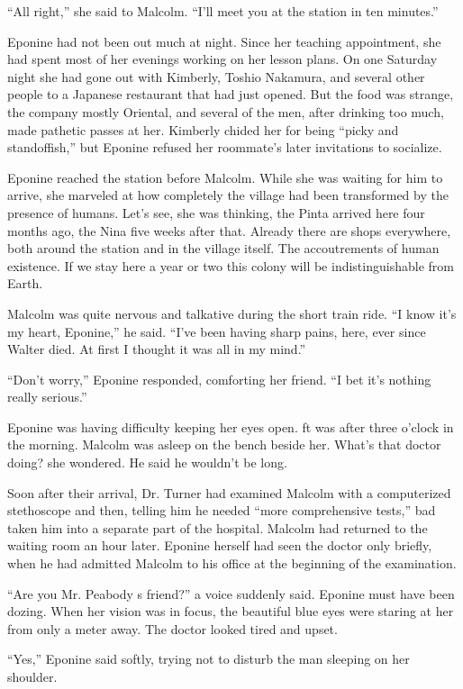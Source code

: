 \documentclass[]{article}
\begin{document}
{“All right,” she said to Malcolm.  “I’ll meet you at the station in ten minutes.”

Eponine had not been out much at night.  Since her teaching appointment, she had spent most of her evenings working on her lesson plans.  On one Saturday night she had gone out with Kimberly, Toshio Nakamura, and several other people to a Japanese restaurant that had just opened.  But the food was strange, the company mostly Oriental, and several of the men, after drinking too much, made pathetic passes at her.  Kimberly chided her for being “picky and standoffish,” but Eponine refused her roommate’s later invitations to socialize.

Eponine reached the station before Malcolm.  While she was waiting for him to arrive, she marveled at how completely the village had been transformed by the presence of humans.  Let’s see, she was thinking, the Pinta arrived here four months ago, the Nina five weeks after that.  Already there are shops everywhere, both around the station and in the village itself.  The accoutrements of human existence.  If we stay here a year or two this colony will be indistinguishable from Earth.

Malcolm was quite nervous and talkative during the short train ride.  “I know it’s my heart, Eponine,” he said.  “I’ve been having sharp pains, here, ever since Walter died.  At first I thought it was all in my mind.”

“Don’t worry,” Eponine responded, comforting her friend.  “I bet it’s nothing really serious.”

Eponine was having difficulty keeping her eyes open.  ft was after three o’clock in the morning.  Malcolm was asleep on the bench beside her.  What’s that doctor doing? she wondered.  He said he wouldn’t be long.

Soon after their arrival, Dr.  Turner had examined Malcolm with a computerized stethoscope and then, telling him he needed “more comprehensive tests,” bad taken him into a separate part of the hospital.  Malcolm had returned to the waiting room an hour later.  Eponine herself had seen the doctor only briefly, when he had admitted Malcolm to his office at the beginning of the examination.

“Are you Mr.  Peabody s friend?” a voice suddenly said.  Eponine must have been dozing.  When her vision was in focus, the beautiful blue eyes were staring at her from only a meter away.  The doctor looked tired and upset.

“Yes,” Eponine said softly, trying not to disturb the man sleeping on her shoulder.

}
\end{document}
